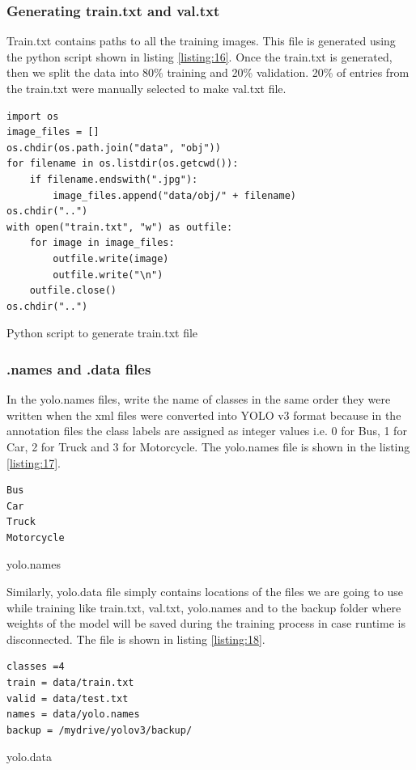\subsubsection*{Generating train.txt and val.txt}
Train.txt contains paths to all the training images. This file is generated using the python script shown in listing \ref{listing:16}. Once the train.txt is generated, then we split the data into 80\% training and 20\% validation.
20\% of entries from the train.txt were manually selected to make val.txt file.
\begin{longlisting}
\begin{verbatim}
import os
image_files = []
os.chdir(os.path.join("data", "obj"))
for filename in os.listdir(os.getcwd()):
    if filename.endswith(".jpg"):
        image_files.append("data/obj/" + filename)
os.chdir("..")
with open("train.txt", "w") as outfile:
    for image in image_files:
        outfile.write(image)
        outfile.write("\n")
    outfile.close()
os.chdir("..")
\end{verbatim}
\caption{Python script to generate train.txt file}
\label{listing:16}
\end{longlisting}
\subsubsection*{.names and .data files}
In the yolo.names files, write the name of classes in the same order they were written when the xml files were converted into YOLO v3 format because in the annotation files the class labels are assigned as integer values i.e. 0 for Bus, 1 for Car, 2 for Truck and 3 for Motorcycle. The yolo.names file is shown in the listing \ref{listing:17}.
\begin{longlisting}
\begin{verbatim}
Bus
Car
Truck 
Motorcycle
\end{verbatim}
\caption{yolo.names}
\label{listing:17}
\end{longlisting}
Similarly, yolo.data file simply contains locations of the files we are going to use while training like train.txt, val.txt, yolo.names and to the backup folder where weights of the model will be saved during the training process in case runtime is disconnected. The file is shown in listing \ref{listing:18}.
\begin{longlisting}
\begin{verbatim}
classes =4
train = data/train.txt
valid = data/test.txt
names = data/yolo.names 
backup = /mydrive/yolov3/backup/
\end{verbatim}
\caption{yolo.data}
\label{listing:18}
\end{longlisting}
